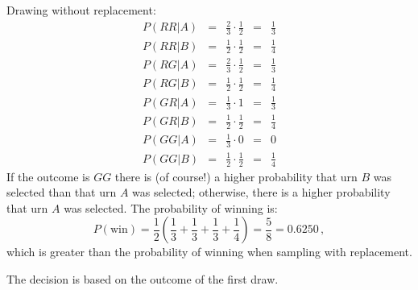  Drawing without replacement:
\[
\renewcommand*{\arraystretch}{1.5}
\begin{array}{lcccc}
P(RR|A) &=& \frac{2}{3} \cdot \frac{1}{2} &=& \frac{1}{3}\\
P(RR|B) &=& \frac{1}{2} \cdot \frac{1}{2} &=& \frac{1}{4}\\
\hline
P(RG|A) &=& \frac{2}{3} \cdot \frac{1}{2} &=& \frac{1}{3}\\
P(RG|B) &=& \frac{1}{2} \cdot \frac{1}{2} &=& \frac{1}{4}\\
\hline
P(GR|A) &=& \frac{1}{3} \cdot 1 &=& \frac{1}{3}\\
P(GR|B) &=& \frac{1}{2} \cdot \frac{1}{2} &=& \frac{1}{4}\\
\hline
P(GG|A) &=& \frac{1}{3} \cdot 0 &=& 0\\
P(GG|B) &=& \frac{1}{2} \cdot \frac{1}{2} &=& \frac{1}{4}
\end{array}
\]
If the outcome is $GG$ there is (of course!) a higher probability that urn $B$ was selected than that urn $A$ was selected; otherwise, there is a higher probability that urn $A$ was selected. The probability of winning is:
\[
P(\textrm{win})=\frac{1}{2}\left(\frac{1}{3} + \frac{1}{3}+ \frac{1}{3}+ \frac{1}{4}\right)=\frac{5}{8}=0.6250\,,
\]
which is greater than the probability of winning when sampling with replacement.

 The decision is based on the outcome of the first draw.

